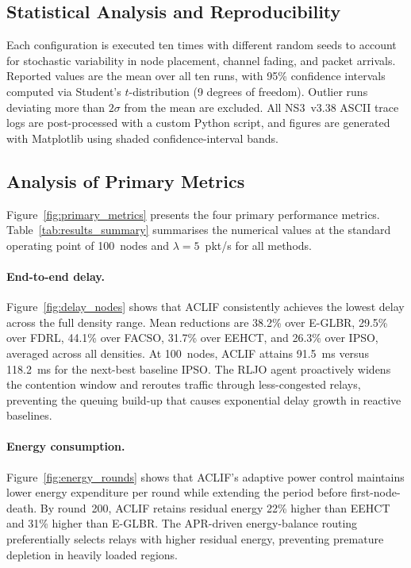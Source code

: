 \documentclass[a4paper]{cas-dc}
\numberwithin{equation}{section}
\begin{document}
\subsection{Statistical Analysis and Reproducibility}
\label{subsec:statistics}

Each configuration is executed ten times with different random seeds to
account for stochastic variability in node placement, channel fading, and
packet arrivals. Reported values are the mean over all ten runs, with 95\%
confidence intervals computed via Student's $t$-distribution (9 degrees of
freedom). Outlier runs deviating more than $2\sigma$ from the mean are
excluded. All NS3~v3.38 ASCII trace logs are post-processed with a custom
Python script, and figures are generated with Matplotlib using shaded
confidence-interval bands.

\subsection{Analysis of Primary Metrics}
\label{subsec:primary}

Figure~\ref{fig:primary_metrics} presents the four primary performance
metrics. Table~\ref{tab:results_summary} summarises the numerical values at
the standard operating point of 100~nodes and $\lambda{=}5$~pkt/s for all
methods.

\paragraph{End-to-end delay.}
Figure~\ref{fig:delay_nodes} shows that ACLIF consistently achieves the
lowest delay across the full density range. Mean reductions are 38.2\% over
E-GLBR, 29.5\% over FDRL, 44.1\% over FACSO, 31.7\% over EEHCT, and 26.3\%
over IPSO, averaged across all densities. At 100~nodes, ACLIF attains
91.5~ms versus 118.2~ms for the next-best baseline IPSO. The RLJO agent
proactively widens the contention window and reroutes traffic through
less-congested relays, preventing the queuing build-up that causes
exponential delay growth in reactive baselines.

\paragraph{Energy consumption.}
Figure~\ref{fig:energy_rounds} shows that ACLIF's adaptive power control
maintains lower energy expenditure per round while extending the period
before first-node-death. By round~200, ACLIF retains residual energy 22\%
higher than EEHCT and 31\% higher than E-GLBR. The APR-driven energy-balance
routing preferentially selects relays with higher residual energy, preventing
premature depletion in heavily loaded regions.
\end{document}

